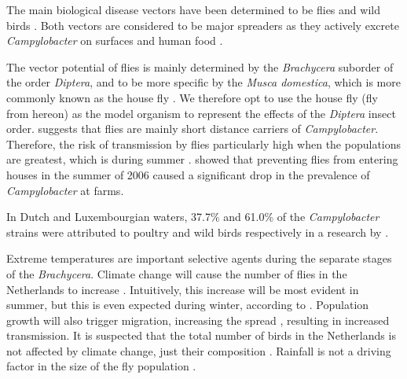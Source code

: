
The main biological disease vectors have been determined to be flies and wild birds \parencite{mughini-gras_quantifying_2016}. Both vectors are considered to be major spreaders as they actively excrete \textit{Campylobacter} on surfaces and human food \parencite{french_molecular_2009, hald_influxed_2008, berndtson_campylobacter_1996}.

The vector potential of flies is mainly determined by the \textit{Brachycera} suborder of the order \textit{Diptera}, and to be more specific by the \textit{Musca domestica}, which is more commonly known as the house fly \parencite{hald_influxed_2008}. We therefore opt to use the house fly (fly from hereon) as the model organism to represent the effects of the \textit{Diptera} insect order. \cite{skovgard_retention_2011} suggests that flies are mainly short distance carriers of \textit{Campylobacter}. Therefore, the risk of transmission by flies particularly high when the populations are greatest, which is during summer \parencite{royden_role_2016}. \cite{hald_use_2007} showed that preventing flies from entering houses in the summer of 2006 caused a significant drop in the prevalence of \textit{Campylobacter} at farms.  %

In Dutch and Luxembourgian waters, 37.7\% and 61.0\% of the \textit{Campylobacter} strains were attributed to poultry and wild birds respectively in a research by \cite{mughini-gras_quantifying_2016}.

Extreme temperatures are important selective agents during the separate stages of the \textit{Brachycera}. Climate change will cause the number of flies in the Netherlands to increase \parencite{goulson_predicting_2005}. Intuitively, this increase will be most evident in summer, but this is even expected during winter, according to \citeauthor{goulson_predicting_2005}. Population growth will also trigger migration, increasing the spread \parencite{feder_locomotion_2010}, resulting in increased transmission. It is suspected that the total number of birds in the Netherlands is not affected by climate change, just their composition \parencite{mclean_reduced_2020, knudsen_challenging_2011}. Rainfall is not a driving factor in the size of the fly population \parencite{goulson_predicting_2005}.%


